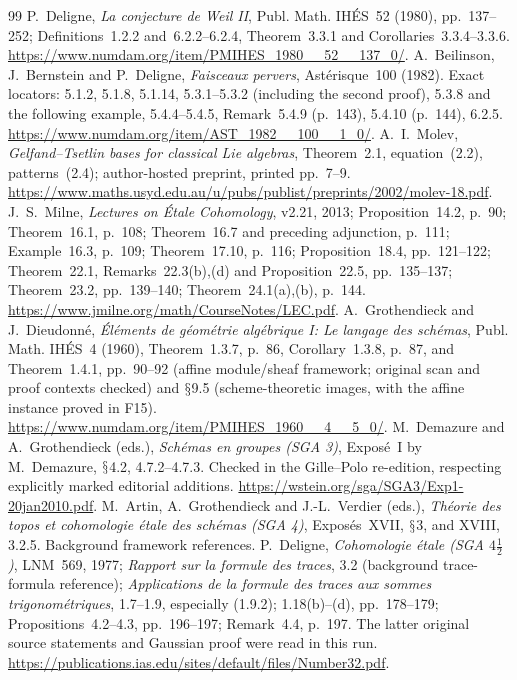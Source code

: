 \documentclass[11pt,a4paper]{article}
\renewcommand{\S}{\ensuremath{\mathsection}}
\theoremstyle{named}\newtheorem{finding}{Finding}[section]
\theoremstyle{definition}\newtheorem{definition}[finding]{Definition}
\theoremstyle{remark}\newtheorem{remark}[finding]{Remark}
\begin{document}
\begin{thebibliography}{99}
 P.~Deligne, \emph{La conjecture de Weil II}, Publ. Math. IH\'ES~52 (1980), pp.~137--252; Definitions~1.2.2 and~6.2.2--6.2.4, Theorem~3.3.1 and Corollaries~3.3.4--3.3.6. \url{https://www.numdam.org/item/PMIHES_1980__52__137_0/}.
 A.~Beilinson, J.~Bernstein and P.~Deligne, \emph{Faisceaux pervers}, Ast\'erisque~100 (1982). Exact locators: 5.1.2, 5.1.8, 5.1.14, 5.3.1--5.3.2 (including the second proof), 5.3.8 and the following example, 5.4.4--5.4.5, Remark~5.4.9 (p.~143), 5.4.10 (p.~144), 6.2.5. \url{https://www.numdam.org/item/AST_1982__100__1_0/}.
 A.~I.~Molev, \emph{Gelfand--Tsetlin bases for classical Lie algebras}, Theorem~2.1, equation~(2.2), patterns~(2.4); author-hosted preprint, printed pp.~7--9. \url{https://www.maths.usyd.edu.au/u/pubs/publist/preprints/2002/molev-18.pdf}.
 J.~S.~Milne, \emph{Lectures on \'Etale Cohomology}, v2.21, 2013; Proposition~14.2, p.~90; Theorem~16.1, p.~108; Theorem~16.7 and preceding adjunction, p.~111; Example~16.3, p.~109; Theorem~17.10, p.~116; Proposition~18.4, pp.~121--122; Theorem~22.1, Remarks~22.3(b),(d) and Proposition~22.5, pp.~135--137; Theorem~23.2, pp.~139--140; Theorem~24.1(a),(b), p.~144. \url{https://www.jmilne.org/math/CourseNotes/LEC.pdf}.
 A.~Grothendieck and J.~Dieudonn\'e, \emph{\'El\'ements de g\'eom\'etrie alg\'ebrique I: Le langage des sch\'emas}, Publ. Math. IH\'ES~4 (1960), Theorem~1.3.7, p.~86, Corollary~1.3.8, p.~87, and Theorem~1.4.1, pp.~90--92 (affine module/sheaf framework; original scan and proof contexts checked) and \S9.5 (scheme-theoretic images, with the affine instance proved in F15). \url{https://www.numdam.org/item/PMIHES_1960__4__5_0/}.
 M.~Demazure and A.~Grothendieck (eds.), \emph{Sch\'emas en groupes (SGA 3)}, Expos\'e~I by M.~Demazure, \S4.2, 4.7.2--4.7.3. Checked in the Gille--Polo re-edition, respecting explicitly marked editorial additions. \url{https://wstein.org/sga/SGA3/Exp1-20jan2010.pdf}.
 M.~Artin, A.~Grothendieck and J.-L.~Verdier (eds.), \emph{Th\'eorie des topos et cohomologie \'etale des sch\'emas (SGA 4)}, Expos\'es~XVII, \S3, and XVIII, 3.2.5. Background framework references.
 P.~Deligne, \emph{Cohomologie \'etale (SGA $4\frac12$)}, LNM~569, 1977; \emph{Rapport sur la formule des traces}, 3.2 (background trace-formula reference); \emph{Applications de la formule des traces aux sommes trigonom\'etriques}, 1.7--1.9, especially (1.9.2); 1.18(b)--(d), pp.~178--179; Propositions~4.2--4.3, pp.~196--197; Remark~4.4, p.~197. The latter original source statements and Gaussian proof were read in this run. \url{https://publications.ias.edu/sites/default/files/Number32.pdf}.

\end{thebibliography}
\end{document}
